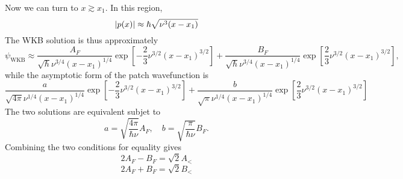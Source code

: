 \documentclass[12pt]{article}
\begin{document}
Now we can turn to $x \gtrsim x_1$. In this region,
\[ \abs{p(x)} \approx \hbar\sqrt{\nu^3(x-x_1)} \]
The WKB solution is thus approximately
\[ \psi_\text{WKB} \approx \frac{A_F}{\sqrt{\hbar}\nu^{3/4}(x-x_1)^{1/4}}\exp\left[-\frac{2}{3}\nu^{3/2}(x-x_1)^{3/2}\right] + \frac{B_F}{\sqrt{\hbar}\nu^{3/4}(x-x_1)^{1/4}}\exp\left[\frac{2}{3}\nu^{3/2}(x-x_1)^{3/2}\right], \]
while the asymptotic form of the patch wavefunction is
\[ \frac{a}{\sqrt{4\pi}\nu^{1/4}(x-x_1)^{1/4}}\exp\left[-\frac{2}{3}\nu^{3/2}(x-x_1)^{3/2}\right] + \frac{b}{\sqrt{\pi}\nu^{1/4}(x-x_1)^{1/4}}\exp\left[\frac{2}{3}\nu^{3/2}(x-x_1)^{3/2}\right] \]
The two solutions are equivalent subjet to 
\[ a = \sqrt{\frac{4\pi}{\hbar\nu}}A_F, \quad b = \sqrt{\frac{\pi}{\hbar\nu}}B_F. \tag{2}\]
Combining the two conditions for equality gives
\[ 2A_F - B_F = \sqrt{2}A_< \]
\[ 2A_F + B_F = \sqrt{2}B_< \]
\end{document}
